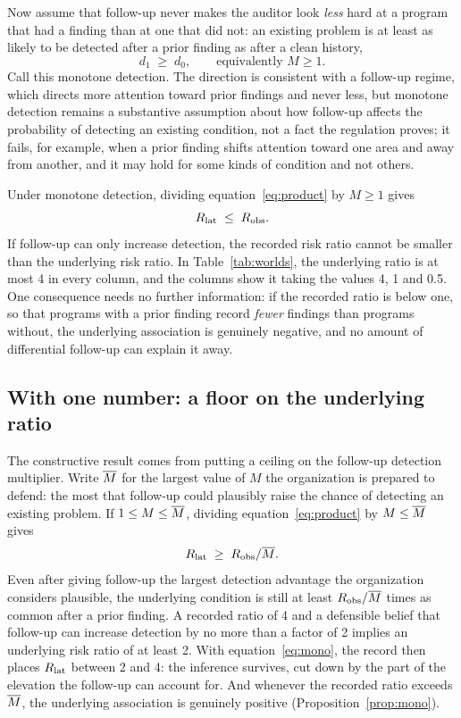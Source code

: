 Now assume that follow-up never makes the auditor look \emph{less} hard at a
program that had a finding than at one that did not: an existing problem is at
least as likely to be detected after a prior finding as after a clean history,
%
\[
  d_1 \;\ge\; d_0 , \qquad \text{equivalently } M \ge 1 .
\]
%
Call this monotone detection. The direction is consistent with a follow-up
regime, which directs more attention toward prior findings and never less,
but monotone detection remains a substantive assumption about how follow-up
affects the probability of detecting an existing condition, not a fact the
regulation proves; it fails, for example, when a prior finding shifts
attention toward one area and away from another, and it may hold for some
kinds of condition and not others.

Under monotone detection, dividing equation~\eqref{eq:product} by $M \ge 1$
gives
%
\begin{equation}\label{eq:mono}
  R_{\mathrm{lat}} \;\le\; R_{\mathrm{obs}} .
\end{equation}
%
If follow-up can only increase detection, the recorded risk ratio cannot be
smaller than the underlying risk ratio. In Table~\ref{tab:worlds}, the underlying ratio is at most 4 in every
column, and the columns show it taking the values 4, 1 and 0.5. One
consequence needs no further information: if the recorded ratio is below one,
so that programs with a prior finding record \emph{fewer} findings than
programs without, the underlying association is genuinely negative, and no
amount of differential follow-up can explain it away.

\subsection{With one number: a floor on the underlying ratio}

The constructive result comes from putting a ceiling on the follow-up
detection multiplier. Write $\overline{M}$ for the largest value of $M$ the
organization is prepared to defend: the most that follow-up could plausibly
raise the chance of detecting an existing problem. If $1 \le M \le \overline{M}$,
dividing equation~\eqref{eq:product} by $M \le \overline{M}$ gives
%
\begin{equation}\label{eq:mbar}
  R_{\mathrm{lat}} \;\ge\; R_{\mathrm{obs}} / \overline{M} .
\end{equation}
%
Even after giving follow-up the largest detection advantage the organization
considers plausible, the underlying condition is still at least $R_{\mathrm{obs}}/\overline{M}$
times as common after a prior finding. A recorded ratio of 4 and a defensible
belief that follow-up can increase detection by no more than a factor of 2
implies an underlying risk ratio of at least 2. With equation~\eqref{eq:mono},
the record then places $R_{\mathrm{lat}}$ between 2 and 4: the inference survives, cut
down by the part of the elevation the follow-up can account for. And whenever
the recorded ratio exceeds $\overline{M}$, the underlying association is genuinely
positive (Proposition~\ref{prop:mono}).

